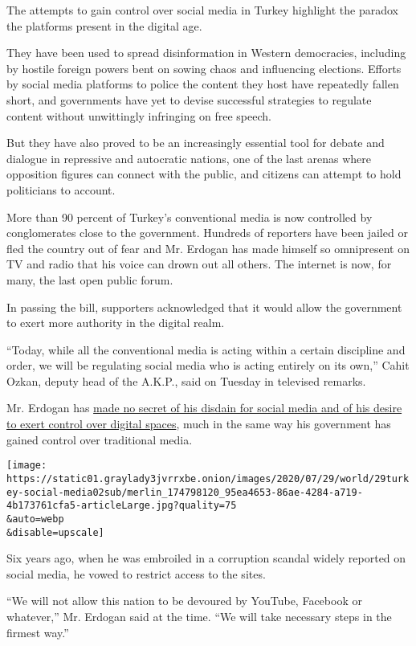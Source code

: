 The attempts to gain control over social media in Turkey highlight the
paradox the platforms present in the digital age.

They have been used to spread disinformation in Western democracies,
including by hostile foreign powers bent on sowing chaos and influencing
elections. Efforts by social media platforms to police the content they
host have repeatedly fallen short, and governments have yet to devise
successful strategies to regulate content without unwittingly infringing
on free speech.

But they have also proved to be an increasingly essential tool for
debate and dialogue in repressive and autocratic nations, one of the
last arenas where opposition figures can connect with the public, and
citizens can attempt to hold politicians to account.

More than 90 percent of Turkey's conventional media is now controlled by
conglomerates close to the government. Hundreds of reporters have been
jailed or fled the country out of fear and Mr. Erdogan has made himself
so omnipresent on TV and radio that his voice can drown out all others.
The internet is now, for many, the last open public forum.

In passing the bill, supporters acknowledged that it would allow the
government to exert more authority in the digital realm.

``Today, while all the conventional media is acting within a certain
discipline and order, we will be regulating social media who is acting
entirely on its own,'' Cahit Ozkan, deputy head of the A.K.P., said on
Tuesday in televised remarks.

Mr. Erdogan has
\href{https://www.nytimes3xbfgragh.onion/interactive/2019/11/13/magazine/internet-turkey.html}{made
no secret of his disdain for social media and of his desire to exert
control over digital spaces}, much in the same way his government has
gained control over traditional media.

\texttt{[image: https://static01.graylady3jvrrxbe.onion/images/2020/07/29/world/29turkey-social-media02sub/merlin\_174798120\_95ea4653-86ae-4284-a719-4b173761cfa5-articleLarge.jpg?quality=75\\\&auto=webp\\\&disable=upscale]}

Six years ago, when he was embroiled in a corruption scandal widely
reported on social media, he vowed to restrict access to the sites.

``We will not allow this nation to be devoured by YouTube, Facebook or
whatever,'' Mr. Erdogan said at the time. ``We will take necessary steps
in the firmest way.''

